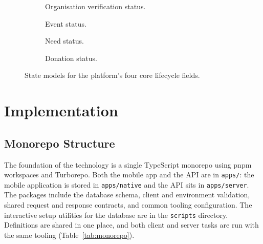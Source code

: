 \begin{figure}[H]
    \centering
    \begin{subfigure}[t]{0.38\textwidth}
        \centering
        \caption{Organisation verification status.}
    \end{subfigure}\hfill
    \begin{subfigure}[t]{0.38\textwidth}
        \centering
        \caption{Event status.}
    \end{subfigure}
    \par\vspace{0.15in}
    \begin{subfigure}[t]{0.38\textwidth}
        \centering
        \caption{Need status.}
    \end{subfigure}\hfill
    \begin{subfigure}[t]{0.38\textwidth}
        \centering
        \caption{Donation status.}
    \end{subfigure}
    \caption{State models for the platform's four core lifecycle fields.}
    \label{fig:states}
\end{figure}

\clearpage

\chapter{Implementation}
\label{ch:implementation}

\section{Monorepo Structure}
The foundation of the technology is a single TypeScript monorepo using pnpm workspaces and Turborepo. Both the mobile app and the API are in \texttt{apps/}: the mobile application is stored in \texttt{apps/native} and the API sits in \texttt{apps/server}. The packages include the database schema, client and environment validation, shared request and response contracts, and common tooling configuration. The interactive setup utilities for the database are in the \texttt{scripts} directory. Definitions are shared in one place, and both client and server tasks are run with the same tooling (Table~\ref{tab:monorepo}).

